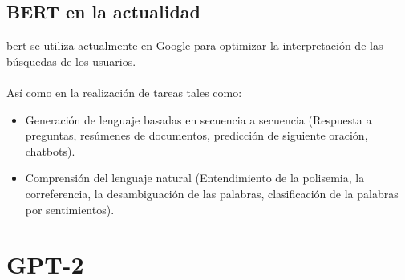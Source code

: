 \documentclass[12pt, a4paper, titlepage]{report}
\begin{document}
		        \subsection{BERT en la actualidad}
		        
		        \acrshort{bert} se utiliza actualmente en Google para optimizar la interpretación de las búsquedas de los usuarios.\\\\
		        Así como en la realización de tareas tales como: \cite{refBertactualidad}
		        \begin{itemize}
		        	\item Generación de lenguaje basadas en secuencia a secuencia (Respuesta a preguntas, resúmenes de documentos, predicción de siguiente oración, chatbots). 
		        	\item Comprensión del lenguaje natural (Entendimiento de la polisemia, la correferencia, la desambiguación de las palabras, clasificación de la palabras por sentimientos).
		        \end{itemize}         
       
        \section{GPT-2}
\end{document}
